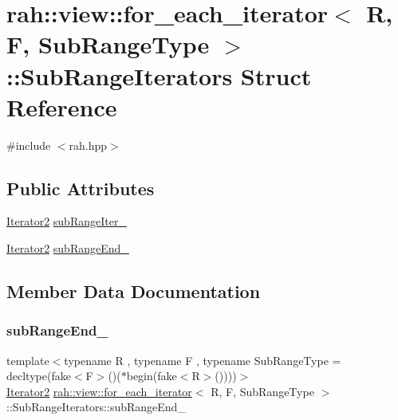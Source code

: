 \hypertarget{structrah_1_1view_1_1for__each__iterator_1_1_sub_range_iterators}{}\section{rah\+::view\+::for\+\_\+each\+\_\+iterator$<$ R, F, Sub\+Range\+Type $>$\+::Sub\+Range\+Iterators Struct Reference}
\label{structrah_1_1view_1_1for__each__iterator_1_1_sub_range_iterators}


{\ttfamily \#include $<$rah.\+hpp$>$}

\subsection*{Public Attributes}
\begin{DoxyCompactItemize}
\item 
\mbox{\hyperlink{structrah_1_1view_1_1for__each__iterator_a13108a8db132a8157375f81cf9b12ce1}{Iterator2}} \mbox{\hyperlink{structrah_1_1view_1_1for__each__iterator_1_1_sub_range_iterators_a0f76c77cd0217895523efc6e30ad08f4}{sub\+Range\+Iter\+\_\+}}
\item 
\mbox{\hyperlink{structrah_1_1view_1_1for__each__iterator_a13108a8db132a8157375f81cf9b12ce1}{Iterator2}} \mbox{\hyperlink{structrah_1_1view_1_1for__each__iterator_1_1_sub_range_iterators_abf8ca1d5f1f1249de9dd5068f6a41e9f}{sub\+Range\+End\+\_\+}}
\end{DoxyCompactItemize}


\subsection{Member Data Documentation}
\mbox{\label{structrah_1_1view_1_1for__each__iterator_1_1_sub_range_iterators_abf8ca1d5f1f1249de9dd5068f6a41e9f}} 
\subsubsection{\texorpdfstring{subRangeEnd\_}{subRangeEnd\_}}
{\footnotesize\ttfamily template$<$typename R , typename F , typename Sub\+Range\+Type  = decltype(fake$<$\+F$>$()($\ast$begin(fake$<$\+R$>$())))$>$ \\
\mbox{\hyperlink{structrah_1_1view_1_1for__each__iterator_a13108a8db132a8157375f81cf9b12ce1}{Iterator2}} \mbox{\hyperlink{structrah_1_1view_1_1for__each__iterator}{rah\+::view\+::for\+\_\+each\+\_\+iterator}}$<$ R, F, Sub\+Range\+Type $>$\+::Sub\+Range\+Iterators\+::sub\+Range\+End\+\_\+}

